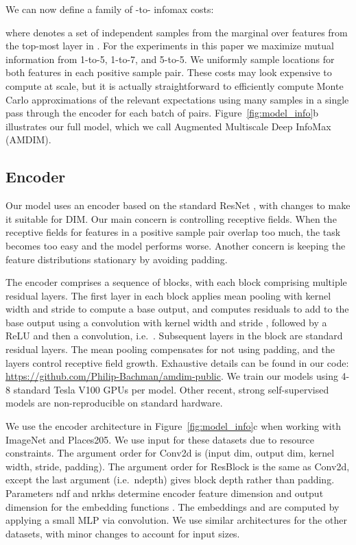 \documentclass{article}
\begin{document}
We can now define a family of -to- infomax costs:

where  denotes a set of independent samples from the marginal  over features from the top-most  layer in . For the experiments in this paper we maximize mutual information from 1-to-5, 1-to-7, and 5-to-5. We uniformly sample locations for both features in each positive sample pair. These costs may look expensive to compute at scale, but it is actually straightforward to efficiently compute Monte Carlo approximations of the relevant expectations using many samples in a single pass through the encoder for each batch of  pairs. Figure~\ref{fig:model_info}b illustrates our full model, which we call Augmented Multiscale Deep InfoMax (AMDIM).

\subsection{Encoder}
Our model uses an encoder based on the standard ResNet \citep{He2016a, He2016b}, with changes to make it suitable for DIM. Our main concern is controlling receptive fields. When the receptive fields for features in a positive sample pair overlap too much, the task becomes too easy and the model performs worse. Another concern is keeping the feature distributions stationary by avoiding padding.

The encoder comprises a sequence of blocks, with each block comprising multiple residual layers. The first layer in each block applies mean pooling with kernel width  and stride  to compute a base output, and computes residuals to add to the base output using a convolution with kernel width  and stride , followed by a ReLU and then a  convolution, i.e.~. Subsequent layers in the block are standard  residual layers. The mean pooling compensates for not using padding, and the  layers control receptive field growth. Exhaustive details can be found in our code: \url{https://github.com/Philip-Bachman/amdim-public}. We train our models using 4-8 standard Tesla V100 GPUs per model. Other recent, strong self-supervised models are non-reproducible on standard hardware.

We use the encoder architecture in Figure~\ref{fig:model_info}c when working with ImageNet and Places205.
We use  input for these datasets due to resource constraints.
The argument order for Conv2d is (input dim, output dim, kernel width, stride, padding). The argument order for ResBlock is the same as Conv2d, except the last argument (i.e.~ndepth) gives block depth rather than padding. Parameters ndf and nrkhs determine encoder feature dimension and output dimension for the embedding functions . The embeddings  and  are computed by applying a small MLP via convolution. We use similar architectures for the other datasets, with minor changes to account for input sizes.
\end{document}
